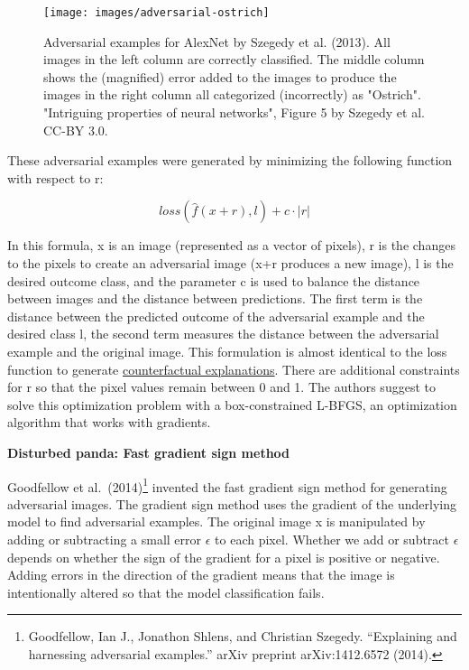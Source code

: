 \documentclass[
  11pt,
]{scrbook}
\begin{document}
\begin{figure}

{\centering \texttt{[image: images/adversarial-ostrich]} 

}

\caption{Adversarial examples for AlexNet by Szegedy et al. (2013). All images in the left column are correctly classified. The middle column shows the (magnified) error added to the images to produce the images in the right column all categorized (incorrectly) as "Ostrich". "Intriguing properties of neural networks", Figure 5 by Szegedy et al. CC-BY 3.0.}\label{fig:adversarial-ostrich}
\end{figure}

These adversarial examples were generated by minimizing the following function with respect to r:

\[loss(\hat{f}(x+r),l)+c\cdot|r|\]

In this formula, x is an image (represented as a vector of pixels), r is the changes to the pixels to create an adversarial image (x+r produces a new image), l is the desired outcome class, and the parameter c is used to balance the distance between images and the distance between predictions.
The first term is the distance between the predicted outcome of the adversarial example and the desired class l, the second term measures the distance between the adversarial example and the original image.
This formulation is almost identical to the loss function to generate \protect\hyperlink{counterfactual}{counterfactual explanations}.
There are additional constraints for r so that the pixel values remain between 0 and 1.
The authors suggest to solve this optimization problem with a box-constrained L-BFGS, an optimization algorithm that works with gradients.

\textbf{Disturbed panda: Fast gradient sign method}

Goodfellow et al.~(2014)\footnote{Goodfellow, Ian J., Jonathon Shlens, and Christian Szegedy. ``Explaining and harnessing adversarial examples.'' arXiv preprint arXiv:1412.6572 (2014).} invented the fast gradient sign method for generating adversarial images.
The gradient sign method uses the gradient of the underlying model to find adversarial examples.
The original image x is manipulated by adding or subtracting a small error \(\epsilon\) to each pixel.
Whether we add or subtract \(\epsilon\) depends on whether the sign of the gradient for a pixel is positive or negative.
Adding errors in the direction of the gradient means that the image is intentionally altered so that the model classification fails.
\end{document}
